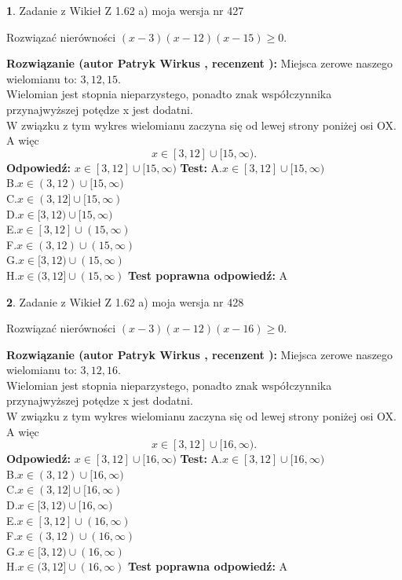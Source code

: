 \documentclass[12pt, a4paper]{article}
\theoremstyle{definition} %
\newtheorem{zad}{}
\newcommand{\zadStart}[1]{\begin{zad}#1\newline}
\newcommand{\zadStop}{\end{zad}}
\newcommand{\rozwStart}[2]{\noindent \textbf{Rozwiązanie (autor #1 , recenzent #2): }\newline}
\newcommand{\rozwStop}{\newline}
\newcommand{\odpStart}{\noindent \textbf{Odpowiedź:}\newline}
\newcommand{\odpStop}{\newline}
\newcommand{\testStart}{\noindent \textbf{Test:}\newline}
\newcommand{\testStop}{\newline}
\newcommand{\kluczStart}{\noindent \textbf{Test poprawna odpowiedź:}\newline}
\newcommand{\kluczStop}{\newline}
\begin{document}
\zadStart{Zadanie z Wikieł Z 1.62 a) moja wersja nr 427}

Rozwiązać nierówności $(x-3)(x-12)(x-15)\ge0$.
\zadStop
\rozwStart{Patryk Wirkus}{}
Miejsca zerowe naszego wielomianu to: $3, 12, 15$.\\
Wielomian jest stopnia nieparzystego, ponadto znak współczynnika przy\linebreak najwyższej potędze x jest dodatni.\\ W związku z tym wykres wielomianu zaczyna się od lewej strony poniżej osi OX. A więc $$x \in [3,12] \cup [15,\infty).$$
\rozwStop
\odpStart
$x \in [3,12] \cup [15,\infty)$
\odpStop
\testStart
A.$x \in [3,12] \cup [15,\infty)$\\
B.$x \in (3,12) \cup [15,\infty)$\\
C.$x \in (3,12] \cup [15,\infty)$\\
D.$x \in [3,12) \cup [15,\infty)$\\
E.$x \in [3,12] \cup (15,\infty)$\\
F.$x \in (3,12) \cup (15,\infty)$\\
G.$x \in [3,12) \cup (15,\infty)$\\
H.$x \in (3,12] \cup (15,\infty)$
\testStop
\kluczStart
A
\kluczStop



\zadStart{Zadanie z Wikieł Z 1.62 a) moja wersja nr 428}

Rozwiązać nierówności $(x-3)(x-12)(x-16)\ge0$.
\zadStop
\rozwStart{Patryk Wirkus}{}
Miejsca zerowe naszego wielomianu to: $3, 12, 16$.\\
Wielomian jest stopnia nieparzystego, ponadto znak współczynnika przy\linebreak najwyższej potędze x jest dodatni.\\ W związku z tym wykres wielomianu zaczyna się od lewej strony poniżej osi OX. A więc $$x \in [3,12] \cup [16,\infty).$$
\rozwStop
\odpStart
$x \in [3,12] \cup [16,\infty)$
\odpStop
\testStart
A.$x \in [3,12] \cup [16,\infty)$\\
B.$x \in (3,12) \cup [16,\infty)$\\
C.$x \in (3,12] \cup [16,\infty)$\\
D.$x \in [3,12) \cup [16,\infty)$\\
E.$x \in [3,12] \cup (16,\infty)$\\
F.$x \in (3,12) \cup (16,\infty)$\\
G.$x \in [3,12) \cup (16,\infty)$\\
H.$x \in (3,12] \cup (16,\infty)$
\testStop
\kluczStart
A
\kluczStop
\end{document}
